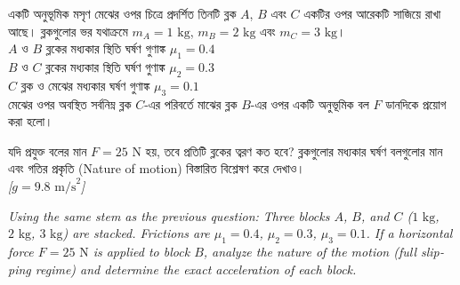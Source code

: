 \documentclass[12pt, a4paper]{article}
\begin{document}
\begin{tcolorbox}[questionbox={প্রশ্ন (Question) 6}]
\noindent
একটি অনুভূমিক মসৃণ মেঝের ওপর চিত্রে প্রদর্শিত তিনটি ব্লক $A$, $B$ এবং $C$ একটির ওপর আরেকটি সাজিয়ে রাখা আছে। ব্লকগুলোর ভর যথাক্রমে $m_A = 1\text{ kg}$, $m_B = 2\text{ kg}$ এবং $m_C = 3\text{ kg}$। \\
$A$ ও $B$ ব্লকের মধ্যকার স্থিতি ঘর্ষণ গুণাঙ্ক $\mu_1 = 0.4$ \\
$B$ ও $C$ ব্লকের মধ্যকার স্থিতি ঘর্ষণ গুণাঙ্ক $\mu_2 = 0.3$ \\
$C$ ব্লক ও মেঝের মধ্যকার ঘর্ষণ গুণাঙ্ক $\mu_3 = 0.1$ \\
মেঝের ওপর অবস্থিত সর্বনিম্ন ব্লক $C$-এর পরিবর্তে মাঝের ব্লক $B$-এর ওপর একটি অনুভূমিক বল $F$ ডানদিকে প্রয়োগ করা হলো। 

\vspace{0.3em}
\noindent
যদি প্রযুক্ত বলের মান $F = 25\text{ N}$ হয়, তবে প্রতিটি ব্লকের ত্বরণ কত হবে? ব্লকগুলোর মধ্যকার ঘর্ষণ বলগুলোর মান এবং গতির প্রকৃতি (Nature of motion) বিস্তারিত বিশ্লেষণ করে দেখাও। \\
\textit{[$g = 9.8\text{ m/s}^2$]}

\vspace{0.8em}
\begin{english}
\noindent\textit{\color{darkgray}
Using the same stem as the previous question: Three blocks $A$, $B$, and $C$ ($1\text{ kg}$, $2\text{ kg}$, $3\text{ kg}$) are stacked. Frictions are $\mu_1 = 0.4$, $\mu_2 = 0.3$, $\mu_3 = 0.1$. If a horizontal force $F = 25\text{ N}$ is applied to block $B$, analyze the nature of the motion (full slipping regime) and determine the exact acceleration of each block.
}
\end{english}
\end{tcolorbox}
\end{document}
